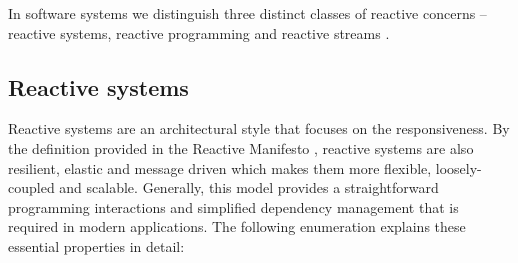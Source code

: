 \documentclass[oneside,
  digital, %
  table,   %
  nolof,     %
  nolot,     %
]{fithesis3}
\begin{document}
In software systems we distinguish three distinct classes of reactive concerns -- reactive systems, reactive programming and reactive streams \cite{reactive_landscape}. 

\subsection{Reactive systems}

Reactive systems are an architectural style that focuses on the responsiveness. By the definition provided in the Reactive Manifesto \cite{reactive_manifesto}, reactive systems are also resilient, elastic and message driven which makes them more flexible, loosely-coupled and scalable. Generally, this model provides a straightforward programming interactions and simplified dependency management that is required in modern applications. The following enumeration explains these essential properties in detail:
\end{document}
